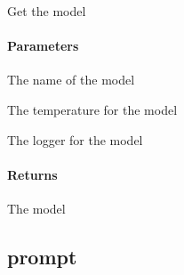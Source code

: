 \documentclass[letterpaper,10pt,english]{sphinxmanual}
\begin{document}
\begin{fulllineitems}
\label{\detokenize{autoapi/models/index:models.get_model}}
\pysigstartsignatures
{}
\pysigstopsignatures
\sphinxAtStartPar
Get the model


\paragraph{Parameters}
\label{\detokenize{autoapi/models/index:parameters}}\begin{description}
\sphinxAtStartPar
The name of the model

\sphinxAtStartPar
The temperature for the model

\sphinxAtStartPar
The logger for the model

\end{description}


\paragraph{Returns}
\label{\detokenize{autoapi/models/index:returns}}\begin{description}
\sphinxAtStartPar
The model

\end{description}

\end{fulllineitems}


\sphinxstepscope


\subsection{prompt}
\label{\detokenize{autoapi/prompt/index:module-prompt}}\label{\detokenize{autoapi/prompt/index:prompt}}\label{\detokenize{autoapi/prompt/index::doc}}
\end{document}
